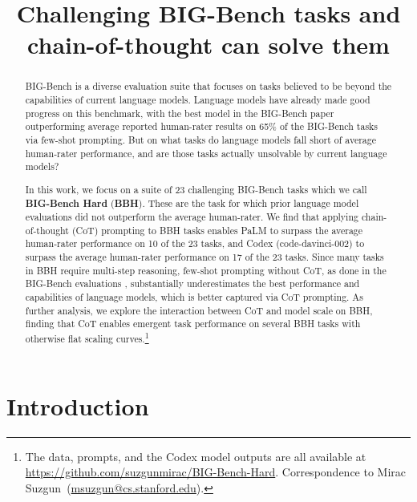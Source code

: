 \title{Challenging BIG-Bench tasks and chain-of-thought can solve them}

\begin{abstract}

BIG-Bench \citep{srivastava2022beyond} is a diverse evaluation suite that focuses on tasks believed to be beyond the capabilities of current language models. Language models have already made good progress on this benchmark, with the best model in the BIG-Bench paper outperforming average reported human-rater results on 65\% of the BIG-Bench tasks via few-shot prompting. But on what tasks do language models fall short of average human-rater performance, and are those tasks actually unsolvable by current language models?

In this work, we focus on a suite of 23 challenging BIG-Bench tasks which we call \textbf{BIG-Bench Hard} (\textbf{BBH}). These are the task for which prior language model evaluations did not outperform the average human-rater. We find that applying chain-of-thought (CoT) prompting to BBH tasks enables PaLM to surpass the average human-rater performance on 10 of the 23 tasks, and Codex (code-davinci-002) to surpass the average human-rater performance on 17 of the 23 tasks. Since many tasks in BBH require multi-step reasoning, few-shot prompting without CoT, as done in the BIG-Bench evaluations \citep{srivastava2022beyond}, substantially underestimates the best performance and capabilities of language models, which is better captured via CoT prompting. As further analysis, we explore the interaction between CoT and model scale on BBH, finding that CoT enables emergent task performance on several BBH tasks with otherwise flat scaling curves.\footnote{The data, prompts, and the Codex model outputs are all available at \mbox{\url{https://github.com/suzgunmirac/BIG-Bench-Hard}.} Correspondence to Mirac Suzgun~(\url{msuzgun@cs.stanford.edu}).}
\end{abstract}

\section{Introduction}
\label{sec:introduction}

